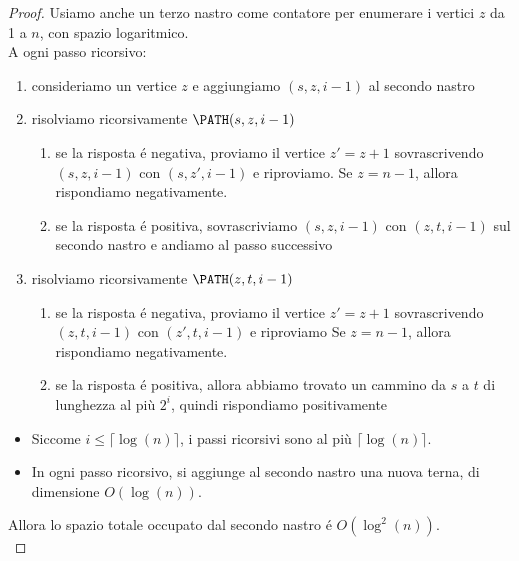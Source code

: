 \begin{proof}
Usiamo anche un terzo nastro come contatore per enumerare i vertici $z$ da 1 a $n$, con spazio logaritmico. \\

A ogni passo ricorsivo:
\begin{enumerate}
    \item consideriamo un vertice $z$ e aggiungiamo $(s, z, i-1)$ al secondo nastro
    \item risolviamo ricorsivamente $\PATH(s, z, i-1)$
    \begin{enumerate}
    \item se la risposta é negativa, proviamo il vertice $z' = z+1$ sovrascrivendo $(s, z, i-1)$ con $(s, z', i-1)$ e riproviamo. 
    \subitem Se $z = n-1$, allora rispondiamo negativamente.
    \item se la risposta é positiva, sovrascriviamo $(s, z, i-1)$ con $(z, t, i-1)$ sul secondo nastro e andiamo al passo successivo
    \end{enumerate}
    \item risolviamo ricorsivamente $\PATH(z, t, i-1)$
    \begin{enumerate}
    \item se la risposta é negativa, proviamo il vertice $z'= z+1$ sovrascrivendo $(z, t, i-1)$ con $(z', t, i-1)$ e riproviamo
    \subitem Se $z = n-1$, allora rispondiamo negativamente.
    \item se la risposta é positiva, allora abbiamo trovato un cammino da $s$ a $t$ di lunghezza al più $2^i$, quindi rispondiamo positivamente \\
    \end{enumerate}
\end{enumerate}

\begin{itemize}
    \item Siccome $i \leq \lceil \log(n) \rceil$, i passi ricorsivi sono al più $\lceil \log(n) \rceil$. 
    \item In ogni passo ricorsivo, si aggiunge al secondo nastro una nuova terna, di dimensione $O(\log(n))$. 
\end{itemize}
Allora lo spazio totale occupato dal secondo nastro é $O(\log^2(n))$. \\
\end{proof}
